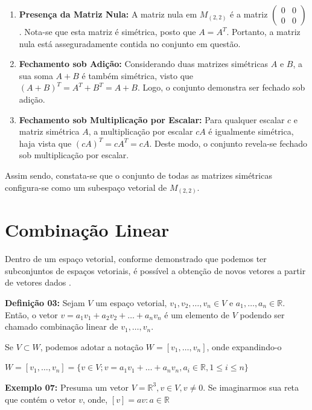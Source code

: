 \begin{enumerate}
    \item \textbf{Presença da Matriz Nula:} A matriz nula em $M_{(2,2)}$ é a matriz $\begin{pmatrix} 0 & 0 \\ 0 & 0 \end{pmatrix}$. Nota-se que esta matriz é simétrica, posto que $A = A^T$. Portanto, a matriz nula está asseguradamente contida no conjunto em questão.
    
    \item \textbf{Fechamento sob Adição:} Considerando duas matrizes simétricas $A$ e $B$, a sua soma $A + B$ é também simétrica, visto que $(A + B)^T = A^T + B^T = A + B$. Logo, o conjunto demonstra ser fechado sob adição.
    
    \item \textbf{Fechamento sob Multiplicação por Escalar:} Para qualquer escalar $c$ e matriz simétrica $A$, a multiplicação por escalar $cA$ é igualmente simétrica, haja vista que $(cA)^T = cA^T = cA$. Deste modo, o conjunto revela-se fechado sob multiplicação por escalar.
\end{enumerate}

Assim sendo, constata-se que o conjunto de todas as matrizes simétricas configura-se como um subespaço vetorial de $M_{(2,2)}$.

\section{Combinação Linear}
Dentro de um espaço vetorial, conforme demonstrado que podemos ter subconjuntos de espaços vetoriais, é possível a obtenção de novos vetores a partir de vetores dados \cite{boldrini1980}.

\noindent\textbf{Definição 03:} Sejam $V$ um espaço vetorial, $v_1, v_2, \ldots, v_n \in V$ e $a_1, \ldots, a_n \in \mathbb{R}$. Então, o vetor $v = a_1v_1 + a_2v_2 + \ldots + a_nv_n$ é um elemento de $V$ podendo ser chamado combinação linear de $v_1, \ldots, v_n$.

Se $V \subset W$, podemos adotar a notação $W = [v_1, \ldots, v_n]$, onde expandindo-o

\centerline{$W = [v_1, \ldots, v_n] = \{v \in V; v = a_1v_1 + \ldots + a_nv_n, a_i \in \mathbb{R}, 1 \leqslant i \leqslant n\}$}

\noindent\textbf{Exemplo 07:} Presuma um vetor $V = \mathbb{R}^3, v \in V, v \neq 0$. Se imaginarmos sua reta que contém o vetor $v$, onde, $[v] = {av: a \in \mathbb{R}}$

